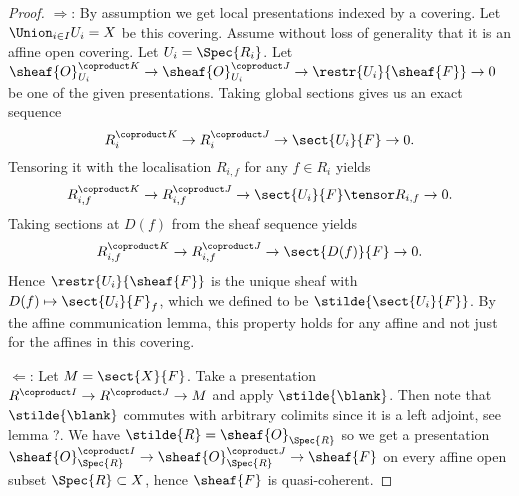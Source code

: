 
\begin{proof}
$\Rightarrow$:
By assumption we get local presentations indexed by a covering.
Let $\Union_{i\in I} U_i = X$ be this covering.
Assume without loss of generality that it is an affine open covering.
Let $U_i = \Spec{R_i}$.
Let $\sheaf{O}_{U_i}^{\coproduct K} \rightarrow \sheaf{O}_{U_i}^{\coproduct J} \rightarrow \restr{U_i}{\sheaf{F}} \rightarrow 0$
be one of the given presentations.
Taking global sections gives us an exact sequence
\[R_i^{\coproduct K} \rightarrow R_i^{\coproduct J} \rightarrow \sect{U_i}{F} \rightarrow 0.\]
Tensoring it with the localisation $R_{i,f}$ for any $f\in R_i$ yields
\[R_{i,f}^{\coproduct K} \rightarrow R_{i,f}^{\coproduct J} \rightarrow \sect{U_i}{F}\tensor R_{i,f} \rightarrow 0.\]
Taking sections at $D(f)$ from the sheaf sequence yields
\[R_{i,f}^{\coproduct K} \rightarrow R_{i,f}^{\coproduct J} \rightarrow \sect{D(f)}{F} \rightarrow 0.\]
Hence $\restr{U_i}{\sheaf{F}}$ is the unique sheaf with 
$D(f) \mapsto \sect{U_i}{F}_f$,
which we defined to be $\stilde{\sect{U_i}{F}}$.
By the affine communication lemma, 
this property holds for any affine and not just for the affines in this covering.

$\Leftarrow$:
Let $M = \sect{X}{F}$.
Take a presentation $R^{\coproduct I} \rightarrow R^{\coproduct J} \rightarrow M$
and apply $\stilde{\blank}$. 
Then note that $\stilde{\blank}$ commutes with arbitrary colimits
since it is a left adjoint, see lemma ?.
We have $\stilde{R} = \sheaf{O}_{\Spec{R}}$
so we get a presentation 
$\sheaf{O}_{\Spec{R}}^{\coproduct I} \rightarrow \sheaf{O}_{\Spec{R}}^{\coproduct J} \rightarrow \sheaf{F}$ 
on every affine open subset $\Spec{R}\subset X$, hence $\sheaf{F}$ is quasi-coherent.
\end{proof}


